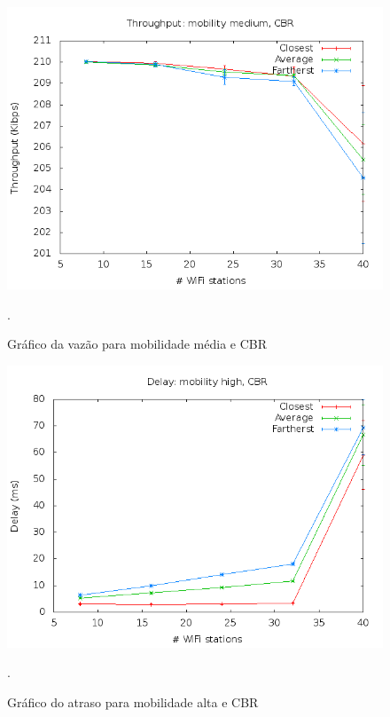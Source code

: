 \documentclass[12pt,twoside,a4paper]{article}
\begin{document}
\begin{figure}[H]
\centering
\includegraphics[scale=0.5]{mo818-throughput-mob-1-traf-0}
\caption{Gráfico da vazão para mobilidade média e CBR}.
\label{fig:vazao-m1-t0}
\end{figure}

\begin{figure}[H]
\centering
\includegraphics[scale=0.5]{mo818-delay-mob-2-traf-0}
\caption{Gráfico do atraso para mobilidade alta e CBR}.
\label{fig:atraso-m2-t0}
\end{figure}
\end{document}
